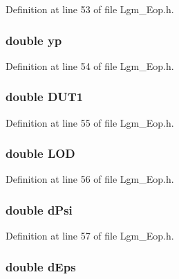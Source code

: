 Definition at line 53 of file Lgm\_\-Eop.h.\hypertarget{struct_lgm___eop_one_7841edcbdbfea2b400dea7753dcfac9e}{
\subsubsection[{yp}]{\setlength{\rightskip}{0pt plus 5cm}double {\bf yp}}}
\label{struct_lgm___eop_one_7841edcbdbfea2b400dea7753dcfac9e}




Definition at line 54 of file Lgm\_\-Eop.h.\hypertarget{struct_lgm___eop_one_3711c22856595eb27022ddb8680cec06}{
\subsubsection[{DUT1}]{\setlength{\rightskip}{0pt plus 5cm}double {\bf DUT1}}}
\label{struct_lgm___eop_one_3711c22856595eb27022ddb8680cec06}




Definition at line 55 of file Lgm\_\-Eop.h.\hypertarget{struct_lgm___eop_one_190ed8b9906021fb489dc2ee35881d8b}{
\subsubsection[{LOD}]{\setlength{\rightskip}{0pt plus 5cm}double {\bf LOD}}}
\label{struct_lgm___eop_one_190ed8b9906021fb489dc2ee35881d8b}




Definition at line 56 of file Lgm\_\-Eop.h.\hypertarget{struct_lgm___eop_one_bdbb574b7039f3276386228756be3072}{
\subsubsection[{dPsi}]{\setlength{\rightskip}{0pt plus 5cm}double {\bf dPsi}}}
\label{struct_lgm___eop_one_bdbb574b7039f3276386228756be3072}




Definition at line 57 of file Lgm\_\-Eop.h.\hypertarget{struct_lgm___eop_one_da0088f7b27e9da12e8e3bf8e9cf61b7}{
\subsubsection[{dEps}]{\setlength{\rightskip}{0pt plus 5cm}double {\bf dEps}}}
\label{struct_lgm___eop_one_da0088f7b27e9da12e8e3bf8e9cf61b7}




